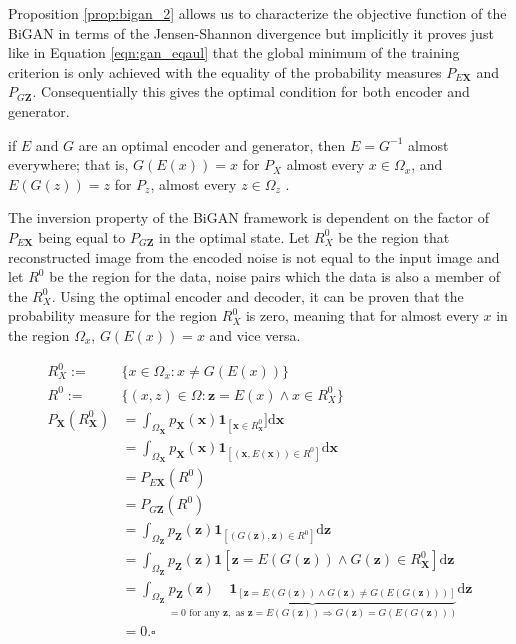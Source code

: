 Proposition \ref{prop:bigan_2} allows us to characterize the objective function of the BiGAN in
terms of the Jensen-Shannon divergence but implicitly it proves just like in Equation
\ref{eqn:gan_eqaul} that the global minimum of the training criterion is only achieved with the
equality of the probability measures $P_{E\mathbf{X}}$ and $P_{G\mathbf{Z}}$. Consequentially this
gives the optimal condition for both encoder and generator. 

\begin{theorem}
    \label{th:bigan_inv}
    if $E$ and $G$ are an optimal encoder and generator, then $E = G^{-1}$ almost everywhere; that is,
    $G(E(x)) = x$ for $P_X$ almost every $x \in \Omega_x$, and $E(G(z)) = z$ for $P_z$, almost every
    $z \in \Omega_z$ .
\end{theorem}

The inversion property of the BiGAN framework is dependent on the factor of $P_{E\mathbf{X}}$ being
equal to $P_{G\mathbf{Z}}$ in the optimal state. Let $R_{X}^{0}$ be the region that
reconstructed image from the encoded noise is not equal to the input image and let $R^{0}$ be the
region for the data, noise pairs which the data is also a member of the $R^{0}_{X}$. Using the
optimal encoder and decoder, it can be proven that the probability measure for the region
$R^{0}_{X}$ is zero, meaning that for almost every $x$ in the region $\Omega_x$, $G(E(x)) = x$ and
vice versa.

\begin{align}
    R^{0}_{X} :=& \{x \in \Omega_x : x \neq G(E(x))\} \\[5pt]
    R^{0} :=& \{(x,z) \in \Omega : \mathbf{z} = E(x) \land x \in R^{0}_{X}\}\\[5pt]
    P_{\mathbf{X}}\left(R_{\mathbf{X}}^{0}\right) &=\int_{\Omega_{\mathbf{X}}} p_{\mathbf{X}}(\mathbf{x}) \mathbf{1}_{\left[\mathbf{x} \in R_{\mathbf{x}}^{0}\right.} ] \mathrm{d} \mathbf{x} \\[5pt]
    &=\int_{\Omega_{\mathbf{X}}} p_{\mathbf{X}}(\mathbf{x}) \mathbf{1}_{\left[(\mathbf{x}, E(\mathbf{x})) \in R^{0}\right]} \mathrm{d} \mathbf{x} \\[5pt]
    & =P_{E \mathbf{X}}\left(R^{0}\right)\\[5pt]
    & =P_{G \mathbf{Z}}\left(R^{0}\right)\\[5pt]
    & =\int_{\Omega_{\mathbf{Z}}} p_{\mathbf{Z}}(\mathbf{z}) \mathbf{1}_{\left[(G(\mathbf{z}), \mathbf{z}) \in R^{0}\right]} \mathrm{d} \mathbf{z}\\[5pt]
    & =\int_{\Omega_{\mathbf{Z}}} p_{\mathbf{Z}}(\mathbf{z}) \mathbf{1}\left[\mathbf{z}=E(G(\mathbf{z})) \wedge G(\mathbf{z}) \in R_{\mathbf{X}}^{0}\right] \mathrm{d} \mathbf{z}\\[5pt]
    & =\int_{\Omega_{\mathbf{Z}}} \underbrace{p_{\mathbf{Z}}(\mathbf{z}) \quad \mathbf{1}_{[\mathbf{z}=E(G(\mathbf{z})) \wedge G(\mathbf{z}) \neq G(E(G(\mathbf{z})))]}}_{=0 \text { for any } \mathbf{z}, \text { as } \mathbf{z}=E(G(\mathbf{z})) \Longrightarrow G(\mathbf{z})=G(E(G(\mathbf{z})))} \mathrm{d} \mathbf{z}\\[5pt]
    &= 0. \square  \\[5pt]
\end{align}

